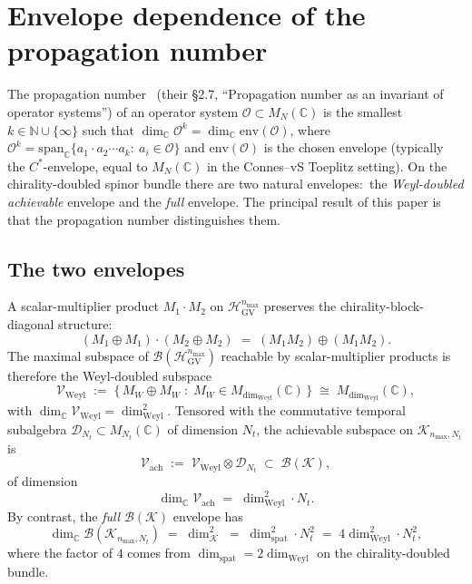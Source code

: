 \documentclass[11pt,a4paper]{article}
\theoremstyle{plain}
\theoremstyle{definition}
\newcommand{\nmax}{n_{\max}}
\newcommand{\Nt}{N_t}
\newcommand{\Krein}{\mathcal{K}}
\newcommand{\Op}{\mathcal{O}}
\newcommand{\Bcal}{\mathcal{B}}
\newcommand{\C}{\mathbb{C}}
\newcommand{\N}{\mathbb{N}}
\newcommand{\Mat}{M}
\newcommand{\HGV}{\mathcal{H}_{\mathrm{GV}}}
\newcommand{\spat}{\mathrm{spat}}
\newcommand{\Weyl}{\mathrm{Weyl}}
\newcommand{\achievable}{\mathrm{ach}}
\begin{document}
\section{Envelope dependence of the propagation number}
\label{sec:propagation}

The propagation number~\cite{connes_vs2021} (their \S 2.7, ``Propagation number as an invariant of operator systems'') of an
operator system $\Op \subset \Mat_N(\C)$ is the smallest $k \in \N
\cup \{\infty\}$ such that
$\dim_\C \Op^k = \dim_\C \mathrm{env}(\Op)$, where
$\Op^k = \mathrm{span}_\C \{a_1 \cdot a_2 \cdots a_k :\ a_i \in \Op\}$
and $\mathrm{env}(\Op)$ is the chosen envelope (typically the
$C^*$-envelope, equal to $\Mat_N(\C)$ in the Connes--vS Toeplitz
setting). On the chirality-doubled spinor bundle there are two
natural envelopes:\ the \emph{Weyl-doubled achievable} envelope and
the \emph{full} envelope. The principal result of this paper is
that the propagation number distinguishes them.

\subsection{The two envelopes}\label{sec:envelopes}

A scalar-multiplier product $M_1 \cdot M_2$ on $\HGV^{\nmax}$
preserves the chirality-block-diagonal structure:
\begin{equation}\label{eq:chirality_diag}
   (M_1 \oplus M_1) \cdot (M_2 \oplus M_2)
   \;=\; (M_1 M_2) \oplus (M_1 M_2).
\end{equation}
The maximal subspace of $\Bcal(\HGV^{\nmax})$ reachable by
scalar-multiplier products is therefore the Weyl-doubled subspace
\begin{equation}\label{eq:weyl_doubled}
   \mathcal{V}_\Weyl
   \;:=\; \bigl\{\, M_W \oplus M_W \;:\; M_W \in \Mat_{\dim_\Weyl}(\C)
                \,\bigr\}
   \;\cong\; \Mat_{\dim_\Weyl}(\C),
\end{equation}
with $\dim_\C \mathcal{V}_\Weyl = \dim_\Weyl^2$. Tensored with the
commutative temporal subalgebra
$\mathcal{D}_{\Nt} \subset \Mat_{\Nt}(\C)$ of dimension $\Nt$, the
achievable subspace on $\Krein_{\nmax, \Nt}$ is
\begin{equation}\label{eq:achievable_def}
   \mathcal{V}_\achievable
   \;:=\; \mathcal{V}_\Weyl \otimes \mathcal{D}_{\Nt}
   \;\subset\; \Bcal(\Krein),
\end{equation}
of dimension
\begin{equation}\label{eq:dim_achievable}
   \dim_\C \mathcal{V}_\achievable
   \;=\; \dim_\Weyl^2 \cdot \Nt.
\end{equation}
By contrast, the \emph{full} $\Bcal(\Krein)$ envelope has
\begin{equation}\label{eq:dim_full}
   \dim_\C \Bcal(\Krein_{\nmax, \Nt})
   \;=\; \dim_\Krein^2
   \;=\; \dim_\spat^2 \cdot \Nt^2
   \;=\; 4 \dim_\Weyl^2 \cdot \Nt^2,
\end{equation}
where the factor of $4$ comes from $\dim_\spat = 2 \dim_\Weyl$ on the
chirality-doubled bundle.
\end{document}
